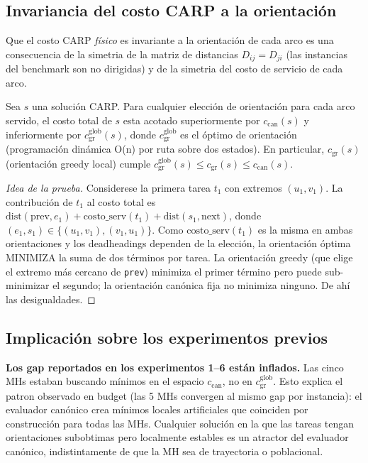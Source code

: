 \subsection{Invariancia del costo CARP a la orientación}

Que el costo CARP \emph{físico} es invariante a la orientación de cada
arco es una consecuencia de la simetria de la matriz de distancias
$D_{ij} = D_{ji}$ (las instancias del benchmark son no dirigidas) y de
la simetria del costo de servicio de cada arco.

\begin{proposicion}
\label{prop:invariancia}
Sea $s$ una solución CARP. Para cualquier elección de orientación para
cada arco servido, el costo total de $s$ esta acotado superiormente por
$c_{\text{can}}(s)$ y inferiormente por $c_{\text{gr}}^{\text{glob}}(s)$,
donde $c_{\text{gr}}^{\text{glob}}$ es el óptimo de orientación
(programación dinámica O(n) por ruta sobre dos estados). En particular,
$c_{\text{gr}}(s)$ (orientación greedy local) cumple
$c_{\text{gr}}^{\text{glob}}(s) \le c_{\text{gr}}(s) \le c_{\text{can}}(s)$.
\end{proposicion}

\begin{proof}[Idea de la prueba]
Considerese la primera tarea $t_1$ con extremos $(u_1, v_1)$. La
contribución de $t_1$ al costo total es $\mathrm{dist}(\text{prev}, e_1) +
\mathrm{costo\_serv}(t_1) + \mathrm{dist}(s_1, \text{next})$, donde
$(e_1, s_1) \in \{(u_1, v_1), (v_1, u_1)\}$. Como
$\mathrm{costo\_serv}(t_1)$ es la misma en ambas orientaciones y los
deadheadings dependen de la elección, la orientación óptima MINIMIZA la
suma de dos términos por tarea. La orientación greedy (que elige el
extremo más cercano de \texttt{prev}) minimiza el primer término pero
puede sub-minimizar el segundo; la orientación canónica fija no
minimiza ninguno. De ahí las desigualdades.
\end{proof}

\subsection{Implicación sobre los experimentos previos}

\textbf{Los gap reportados en los experimentos 1--6 están inflados.}
Las cinco MHs estaban buscando mínimos en el espacio
$c_{\text{can}}$, no en $c_{\text{gr}}^{\text{glob}}$. Esto explica el
patron observado en budget (las 5 MHs convergen al mismo gap por
instancia): el evaluador canónico crea mínimos locales artificiales
que coinciden por construcción para todas las MHs. Cualquier solución
en la que las tareas tengan orientaciones subobtimas pero localmente
estables es un atractor del evaluador canónico, indistintamente de
que la MH sea de trayectoria o poblacional.

